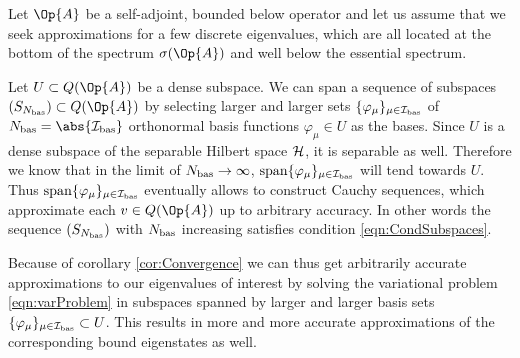 \begin{rem}
	\label{rem:ApproxBottomDiscrete}
	Let $\Op{A}$ be a self-adjoint, bounded below operator
	and let us assume that we seek approximations
	for a few discrete eigenvalues,
	which are all located at the bottom of the spectrum $\sigma(\Op{A})$
	and well below the essential spectrum.

	Let $U \subset Q(\Op{A})$ be a dense subspace.
	We can span a sequence of subspaces $(S_{\Nbas}) \subset Q(\Op{A})$
	by selecting larger and larger sets $\{\varphi_\mu\}_{\mu \in \mathcal{I}_\text{bas}}$
	of $\Nbas = \abs{\Ibas}$ orthonormal basis functions $\varphi_\mu \in U$
	as the bases.
	Since $U$ is a dense subspace of the separable Hilbert space
	$\mathcal{H}$, it is separable as well.
	Therefore we know that
	in the limit of $N_\text{bas} \to \infty$,
	$\operatorname{span} \{\varphi_\mu\}_{\mu \in \mathcal{I}_\text{bas}}$ will tend towards $U$.
	Thus $\operatorname{span} \{\varphi_\mu\}_{\mu \in \mathcal{I}_\text{bas}}$ eventually allows
	to construct Cauchy sequences, which approximate each $v \in Q(\Op{A})$
	up to arbitrary accuracy.
	In other words the sequence $(S_{N_\text{bas}})$ with $N_\text{bas}$ increasing
	satisfies condition \eqref{eqn:CondSubspaces}.

	Because of corollary \ref{cor:Convergence}
	we can thus get arbitrarily accurate approximations
	to our eigenvalues of interest
	by solving the variational problem \eqref{eqn:varProblem}
	in subspaces spanned by larger and larger
	basis sets $\{\varphi_\mu\}_{\mu \in \mathcal{I}_\text{bas}} \subset U$.
	This results in more and more accurate approximations
	of the corresponding bound eigenstates as well.
\end{rem}

